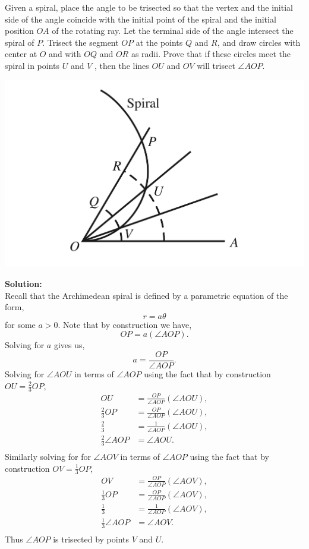 \documentclass[12pt]{article}
\makeatletter
\theoremstyle{homework}
\newenvironment{exercise}[1]
{\def\@currentlabel{#1}\exercisecore}
{\endexercisecore}
\newcommand{\localhead}[1]{\par\smallskip\noindent\textbf{#1}\nobreak\\}%
\newcommand\solution{\localhead{Solution:}}
\makeatother
\begin{document}
\begin{exercise}{10} Given a spiral, place the angle to be trisected so that the vertex 
  and the initial side of the angle coincide with the initial point of the spiral and the
   initial position $OA$ of the rotating ray. Let the terminal side of the angle intersect the
    spiral of $P$. Trisect the segment $OP$ at the points $Q$ and $R$, and draw circles with center at 
    $O$ and with $OQ$ and $OR$ as radii. Prove that if these circles meet the spiral in points $U$ and $V$ , 
    then the lines $OU$ and $OV$ will trisect $\angle AOP$.\\
    \begin{center}
      \includegraphics[width = .50\textwidth]{spiral.png}
    \end{center}  

    \solution Recall that the Archimedean spiral is defined by a parametric equation of the form, 
    \begin{equation*}
      r = a\theta
    \end{equation*}
    for some $a>0$. Note that by construction we have,
    \begin{equation*}
      OP = a(\angle AOP).
    \end{equation*}
    Solving for $a$ gives us, 
    \begin{equation*}
      a = \frac{OP}{\angle AOP}.
    \end{equation*}
    Solving for $\angle AOU$ in terms of $\angle AOP$ using the fact that by construction $OU = \frac{2}{3} OP$,
    \begin{align*}
      OU &= \frac{OP}{\angle AOP} (\angle AOU),\\
      \frac{2}{3}OP &= \frac{OP}{\angle AOP} (\angle AOU),\\
      \frac{2}{3} &= \frac{1}{\angle AOP} (\angle AOU),\\
      \frac{2}{3}{\angle AOP} &= \angle AOU.\\
    \end{align*}
    Similarly solving for for $\angle AOV$ in terms of $\angle AOP$ using the fact that by construction $OV = \frac{1}{3} OP$,
    \begin{align*}
      OV &= \frac{OP}{\angle AOP} (\angle AOV),\\
      \frac{1}{3}OP &= \frac{OP}{\angle AOP} (\angle AOV),\\
      \frac{1}{3} &= \frac{1}{\angle AOP} (\angle AOV),\\
      \frac{1}{3}{\angle AOP} &= \angle AOV.\\
    \end{align*}
Thus $\angle AOP$ is trisected by points $V$ and $U$.


\end{exercise}
\end{document}
